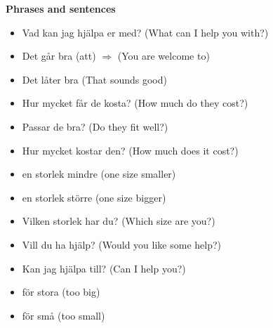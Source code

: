 
\begin{flushleft}
    \textbf{Phrases and sentences}
    \begin{itemize}
        \item Vad kan jag hjälpa er med? (What can I help you with?)
        \item Det går bra (att) $\Rightarrow$ (You are welcome to)
        \item Det låter bra (That sounds good)
        \item Hur mycket får de kosta? (How much do they cost?)
        \item Passar de bra? (Do they fit well?)
        \item Hur mycket kostar den? (How much does it cost?)
        \item en storlek mindre (one size smaller)
        \item en storlek större (one size bigger)
        \item Vilken storlek har du? (Which size are you?)
        \item Vill du ha hjälp? (Would you like some help?)
        \item Kan jag hjälpa till? (Can I help you?)
        \item för stora (too big)
        \item för små (too small)
    \end{itemize}
\end{flushleft}

